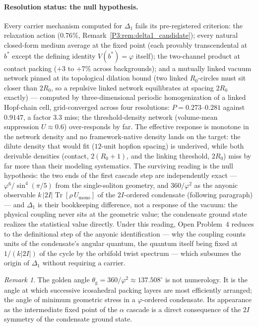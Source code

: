\documentclass[11pt,a4paper]{article}
\theoremstyle{definition}
\theoremstyle{remark}
\newtheorem{remark}[theorem]{Remark}
\newcommand{\vp}{\varphi}
\newcommand{\thetaG}{\theta_{\mathrm{g}}}
\begin{document}
\paragraph{Resolution status: the null hypothesis.}
Every carrier mechanism computed for $\Delta_1$ fails its
pre-registered criterion: the relaxation action ($0.76\%$,
Remark~\ref{P3:rem:delta1_candidate}); every natural closed-form
medium average at the fixed point (each provably transcendental at
$b^*$ except the defining identity $V(b^*)=\vp$ itself); the
two-channel product at contact packing ($+3$ to $+7\%$ across
backgrounds); and a mutually linked vacuum network pinned at its
topological dilation bound (two linked $R_0$-circles must sit closer
than $2R_0$, so a repulsive linked network equilibrates at spacing
$2R_0$ exactly) --- computed by three-dimensional periodic
homogenization of a linked Hopf-chain cell, grid-converged across
four resolutions: $P = 0.273$--$0.281$ against $0.9147$, a factor
$3.3$ miss; the threshold-density network (volume-mean suppression
$U \approx 0.6$) over-responds by far. The effective response is
monotone in the network density and no framework-native density lands
on the target: the dilute density that would fit ($12$-unit hopfion
spacing) is underived, while both derivable densities (contact,
$2(R_0+1)$, and the linking threshold, $2R_0$) miss by far more than
their modeling systematics. The surviving reading is the null
hypothesis: the two ends of the first cascade step are independently
exact --- $\vp^6/\sin^4(\pi/5)$ from the single-soliton geometry,
and $360/\vp^2$ as the anyonic observable
$k\,|2I|\operatorname{Tr}[\rho\,U_{\mathrm{mono}}]$ of the
$2I$-ordered condensate (following paragraph) --- and $\Delta_1$ is
their bookkeeping difference, not a response of the vacuum: the
physical coupling never sits at the geometric value; the condensate
ground state realizes the statistical value directly. Under this
reading, Open Problem~4 reduces to the definitional step of the
anyonic identification --- why the coupling counts units of the
condensate's angular quantum, the quantum itself being fixed at
$1/(k|2I|)$ of the cycle by the orbifold twist spectrum --- which
subsumes the origin of $\Delta_1$ without requiring a carrier.

\begin{remark}
\label{P3:rem:packing_layers}
The golden angle $\thetaG = 360/\vp^2 \approx 137.508^\circ$ is
not numerology.  It is the angle at which successive icosahedral
packing layers are most efficiently arranged; the angle of minimum
geometric stress in a $\vp$-ordered condensate.  Its appearance as
the intermediate fixed point of the $\alpha$ cascade is a direct
consequence of the $2I$ symmetry of the condensate ground state.
\end{remark}
\end{document}
